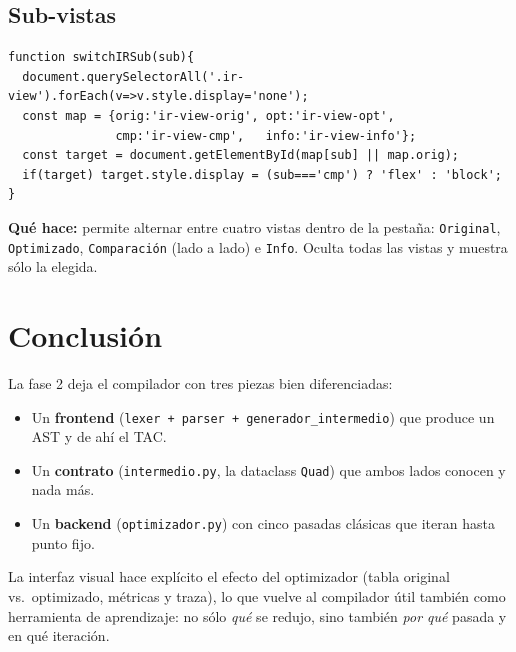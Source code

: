 \documentclass[11pt,a4paper]{article}
\begin{document}
\subsection{Sub-vistas}

\begin{lstlisting}[style=js]
function switchIRSub(sub){
  document.querySelectorAll('.ir-view').forEach(v=>v.style.display='none');
  const map = {orig:'ir-view-orig', opt:'ir-view-opt',
               cmp:'ir-view-cmp',   info:'ir-view-info'};
  const target = document.getElementById(map[sub] || map.orig);
  if(target) target.style.display = (sub==='cmp') ? 'flex' : 'block';
}
\end{lstlisting}

\textbf{Qué hace:} permite alternar entre cuatro vistas dentro de la
pestaña: \texttt{Original}, \texttt{Optimizado}, \texttt{Comparación}
(lado a lado) e \texttt{Info}. Oculta todas las vistas y muestra sólo
la elegida.

\section{Conclusión}

La fase 2 deja el compilador con tres piezas bien diferenciadas:

\begin{itemize}[leftmargin=*]
  \item Un \textbf{frontend} (\texttt{lexer + parser + generador\_intermedio})
        que produce un AST y de ahí el TAC.
  \item Un \textbf{contrato} (\texttt{intermedio.py}, la dataclass
        \texttt{Quad}) que ambos lados conocen y nada más.
  \item Un \textbf{backend} (\texttt{optimizador.py}) con cinco pasadas
        clásicas que iteran hasta punto fijo.
\end{itemize}

La interfaz visual hace explícito el efecto del optimizador (tabla
original vs.\ optimizado, métricas y traza), lo que vuelve al
compilador útil también como herramienta de aprendizaje:
no sólo \emph{qué} se redujo, sino también \emph{por qué} pasada y en
qué iteración.
\end{document}
